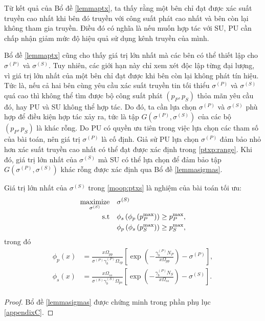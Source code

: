\documentclass[../main.tex]{subfiles}
\begin{document}
Từ kết quả của Bổ đề \ref{lemmaptx}, ta thấy rằng một bên chỉ đạt được xác suất truyền cao nhất khi bên đó truyền với công suất phát cao nhất và bên còn lại không tham gia truyền. Điều đó có nghĩa là nếu muốn hợp tác với SU, PU cần chấp nhận giảm mức độ hiệu quả sử dụng kênh truyền của mình.

Bổ đề \ref{lemmaptx} cũng cho thấy giá trị lớn nhất mà các bên có thể thiết lập cho $\sigma^{(P)}$ và $\sigma^{(S)}$. Tuy nhiên, các giới hạn này chỉ xem xét độc lập từng đại lượng, vì giá trị lớn nhất của một bên chỉ đạt được khi bên còn lại không phát tín hiệu. Tức là, nếu cả hai bên cùng yêu cầu xác suất truyền tin tối thiểu $\sigma^{(P)}$ và $\sigma^{(S)}$ quá cao thì không thể tìm được bộ công suất phát $\left(p_P, p_S\right)$ thỏa mãn yêu cầu đó, hay PU và SU không thể hợp tác. Do đó, ta cần lựa chọn $\sigma^{(P)}$ và $\sigma^{(S)}$ phù hợp để điều kiện hợp tác xảy ra, tức là tập $G\left(\sigma^{(P)}, \sigma^{(S)}\right)$ của các bộ $\left(p_P, p_S\right)$ là khác rỗng. Do PU có quyền ưu tiên trong việc lựa chọn các tham số của bài toán, nên giá trị $\sigma^{(P)}$ là cố định. Giả sử PU lựa chọn $\sigma^{(P)}$ đảm bảo nhỏ hơn xác suất truyền cao nhất có thể đạt được xác định trong \eqref{ptxp:range}. Khi đó, giá trị lớn nhất của $\sigma^{(S)}$ mà SU có thể lựa chọn để đảm bảo tập $G\left(\sigma^{(P)}, \sigma^{(S)}\right)$ khác rỗng được xác định qua Bổ đề \ref{lemmasigmas}.

\begin{lemma}\label{lemmasigmas}
Giá trị lớn nhất của $\sigma^{(S)}$ trong \eqref{moop:ptxs} là nghiệm của bài toán tối ưu:
\begin{subequations}\label{lemmasigmas:opt}
\begin{align}
\underset{\sigma^{(S)}}{\textnormal{maximize}} \quad & \sigma^{(S)} \nonumber \\
\textnormal{s.t} 
\quad & \phi_s\left(\phi_p\left(p_P^{\text{max}}\right)\right) \geq p_P^{\text{max}}, \\
\quad & \phi_p\left(\phi_s\left(p_S^{\text{max}}\right)\right) \geq p_S^{\text{max}},
\end{align}
\end{subequations}
trong đó
\begin{equation}\label{lemmasigmas:g1g2}
\begin{aligned}
    \phi_p\left(x\right) &= 
    \frac{x\Omega_{pp}}{\sigma^{(P)}\gamma_b^{(P)}\Omega_{sp}}
    \left[
        \exp\left( -\frac{\gamma_b^{(P)}N_P}{x\Omega_{pp}} \right)
        - \sigma^{(P)}
    \right], \\
    \phi_s\left(x\right) &= 
    \frac{x\Omega_{ss}}{\sigma^{(S)}\gamma_b^{(S)}\Omega_{ps}}
    \left[
        \exp\left( -\frac{\gamma_b^{(P)}N_S}{x\Omega_{ss}} \right)
        - \sigma^{(S)}
    \right]. \\
\end{aligned}
\end{equation}
\end{lemma}
\begin{proof}
Bổ đề \ref{lemmasigmas} được chứng minh trong phần phụ lục \ref{appendixC}.
\end{proof}
\end{document}

